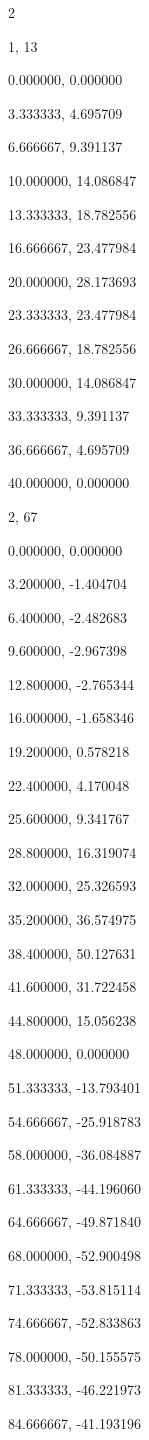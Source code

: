 \documentclass[
]{article}
\begin{document}
2

1, 13

0.000000, 0.000000

3.333333, 4.695709

6.666667, 9.391137

10.000000, 14.086847

13.333333, 18.782556

16.666667, 23.477984

20.000000, 28.173693

23.333333, 23.477984

26.666667, 18.782556

30.000000, 14.086847

33.333333, 9.391137

36.666667, 4.695709

40.000000, 0.000000

2, 67

0.000000, 0.000000

3.200000, -1.404704

6.400000, -2.482683

9.600000, -2.967398

12.800000, -2.765344

16.000000, -1.658346

19.200000, 0.578218

22.400000, 4.170048

25.600000, 9.341767

28.800000, 16.319074

32.000000, 25.326593

35.200000, 36.574975

38.400000, 50.127631

41.600000, 31.722458

44.800000, 15.056238

48.000000, 0.000000

51.333333, -13.793401

54.666667, -25.918783

58.000000, -36.084887

61.333333, -44.196060

64.666667, -49.871840

68.000000, -52.900498

71.333333, -53.815114

74.666667, -52.833863

78.000000, -50.155575

81.333333, -46.221973

84.666667, -41.193196
\end{document}
